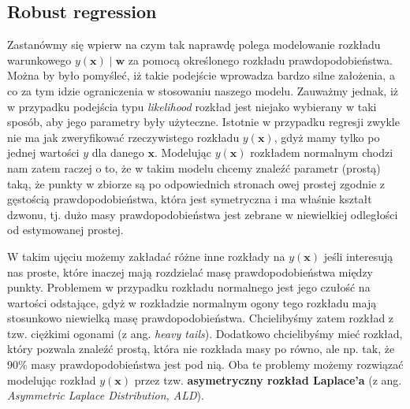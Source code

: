 \documentclass{myclass}
\numberwithin{equation}{section}
\begin{document}
\subsection{Robust regression}

Zastanówmy się wpierw na czym tak naprawdę polega modelowanie rozkładu warunkowego \(y(\mathbf{x})
\mid \mathbf{w}\) za pomocą określonego rozkładu prawdopodobieństwa. Można by było pomyśleć, iż
takie podejście wprowadza bardzo silne założenia, a co za tym idzie ograniczenia w stosowaniu
naszego modelu. Zauważmy jednak, iż w przypadku podejścia typu \textit{likelihood} rozkład jest
niejako wybierany w taki sposób, aby jego parametry były użyteczne. Istotnie w przypadku regresji
zwykle nie ma jak zweryfikować rzeczywistego rozkładu \(y(\mathbf{x})\), gdyż mamy tylko po jednej
wartości \(y\) dla danego \(\mathbf{x}\). Modelując \(y(\mathbf{x})\) rozkładem normalnym chodzi nam
zatem raczej o to, że w takim modelu chcemy znaleźć parametr (prostą) taką, że punkty w zbiorze są
po odpowiednich stronach owej prostej zgodnie z gęstością prawdopodobieństwa, która jest symetryczna
i ma właśnie kształt dzwonu, tj. dużo masy prawdopodobieństwa jest zebrane w niewielkiej odległości
od estymowanej prostej.

W takim ujęciu możemy zakładać różne inne rozkłady na \(y(\mathbf{x})\) jeśli interesują nas proste,
które inaczej mają rozdzielać masę prawdopodobieństwa między punkty. Problemem w przypadku rozkładu
normalnego jest jego czułość na wartości odstające, gdyż w rozkładzie normalnym ogony tego rozkładu
mają stosunkowo niewielką masę prawdopodobieństwa. Chcielibyśmy zatem rozkład z tzw. ciężkimi
ogonami (z ang. \textit{heavy tails}). Dodatkowo chcielibyśmy mieć rozkład, który pozwala znaleźć
prostą, która nie rozkłada masy po równo, ale np. tak, że 90\% masy prawdopodobieństwa jest pod nią.
Oba te problemy możemy rozwiązać modelując rozkład \(y(\mathbf{x})\) przez tzw. \textbf{asymetryczny
rozkład Laplace'a} (z ang. \textit{Asymmetric Laplace Distribution, ALD}).
\end{document}
